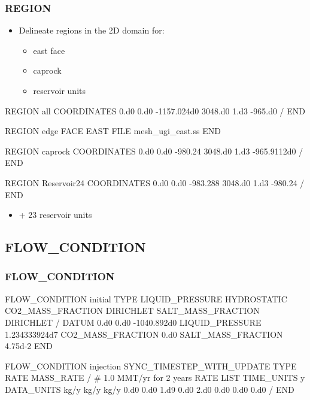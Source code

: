 \documentclass{beamer}
\begin{document}
\begin{frame}\frametitle{REGION}

\begin{itemize}
  \item Delineate regions in the 2D domain for:
  \begin{itemize}
    \item east face
    \item caprock
    \item reservoir units
  \end{itemize}
\end{itemize}

\begin{semiverbatim}
REGION all
  COORDINATES
    0.d0    0.d0 -1157.024d0
    3048.d0 1.d3 -965.d0
  /
END
\newpage

REGION edge
  FACE EAST
  FILE mesh_ugi_east.ss
END

\newpage
REGION caprock
  COORDINATES
    0.d0    0.d0 -980.24
    3048.d0 1.d3 -965.9112d0
  /
END

REGION Reservoir24
  COORDINATES
    0.d0    0.d0 -983.288
    3048.d0 1.d3 -980.24
  /
END
\end{semiverbatim}
\begin{itemize}
  \item + 23 reservoir units
\end{itemize}
\end{frame}

\subsection{FLOW\_CONDITION}

\begin{frame}\frametitle{FLOW\_CONDITION}

\newpage
\begin{semiverbatim}
FLOW_CONDITION initial
  TYPE
    LIQUID_PRESSURE HYDROSTATIC
    CO2_MASS_FRACTION DIRICHLET
    SALT_MASS_FRACTION DIRICHLET
  /
  DATUM 0.d0 0.d0 -1040.892d0
  LIQUID_PRESSURE 1.234333924d7
  CO2_MASS_FRACTION 0.d0
  SALT_MASS_FRACTION 4.75d-2
END

\newpage
FLOW_CONDITION injection
  SYNC_TIMESTEP_WITH_UPDATE
  TYPE
    RATE MASS_RATE
  /
  # 1.0 MMT/yr for 2 years
  RATE LIST
    TIME_UNITS y
    DATA_UNITS kg/y kg/y kg/y
    0.d0 0.d0 1.d9 0.d0
    2.d0 0.d0 0.d0 0.d0
  /
END
\end{semiverbatim}

\end{frame}
\end{document}
